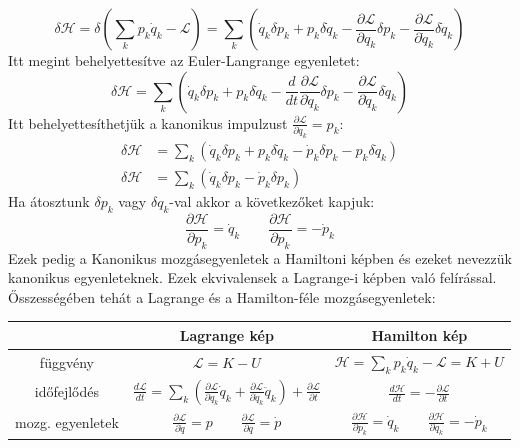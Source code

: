 \documentclass[../main.tex]{subfiles}
\begin{document}
\begin{equation}
    \delta \mathcal{H} = \delta \left( \sum_k p_k \dot{q}_k - \mathcal{L}\right) = \sum_k \left(\dot{q}_k \delta p_k + p_k \delta\dot{q}_k - \frac{\partial \mathcal{L}}{\partial q_k} \delta p_k - \frac{\partial \mathcal{L}}{\partial \dot{q}_k} \delta \dot{q}_k \right)
\end{equation}
Itt megint behelyettesítve az Euler-Langrange egyenletet:
\begin{equation}
    \delta \mathcal{H} = \sum_k \left(\dot{q}_k \delta p_k + p_k \delta\dot{q}_k - \frac{d}{dt} \frac{\partial \mathcal{L}}{\partial \dot{q}_k} \delta p_k - \frac{\partial \mathcal{L}}{\partial \dot{q}_k} \delta \dot{q}_k \right)
\end{equation}
Itt behelyettesíthetjük a kanonikus impulzust $\frac{\partial \mathcal{L}}{\partial \dot{q}_k} = p_k$:
\begin{equation}
    \begin{aligned}
        \delta \mathcal{H} &= \sum_k \left(\dot{q}_k \delta p_k + p_k \delta\dot{q}_k - \dot{p}_k \delta p_k - p_k \delta \dot{q}_k \right) \\
        \delta \mathcal{H} &= \sum_k \left(\dot{q}_k \delta p_k - \dot{p}_k \delta p_k \right)
    \end{aligned}
\end{equation}
Ha átosztunk $\delta p_k$ vagy $\delta q_k$-val akkor a következőket kapjuk:
\begin{equation}
    \frac{\partial \mathcal{H}}{\partial p_k} = \dot{q}_k \qquad \frac{\partial \mathcal{H}}{\partial p_k} = -\dot{p}_k
\end{equation}
Ezek pedig a Kanonikus mozgásegyenletek a Hamiltoni képben és ezeket nevezzük kanonikus egyenleteknek. Ezek ekvivalensek a Lagrange-i képben való felírással. Ősszességében tehát a Lagrange és a Hamilton-féle mozgásegyenletek:
\begin{center}
\begin{tabular}{ | c | c | c | }
\hline
  & Lagrange kép & Hamilton kép \\ 
    \hline
 függvény & $\mathcal{L} = K - U$ & $\mathcal{H} = \sum_k p_k\dot{q}_k - \mathcal{L} = K + U$ \\
 \hline
 időfejlődés & $\frac{d \mathcal{L}}{d t} = \sum_k \left(\frac{\partial \mathcal{L}}{\partial q_k} \dot{q}_k + \frac{\partial \mathcal{L}}{\partial \dot{q}_k} \ddot{q}_k\right) + \frac{\partial \mathcal{L}}{\partial t}$ & $\frac{d \mathcal{H}}{d t} = - \frac{\partial \mathcal{L}}{\partial t}$ \\
 \hline
 mozg. egyenletek & $\frac{\partial \mathcal{L}}{\partial \dot{q}} = p \qquad \frac{\partial \mathcal{L}}{\partial q} = \dot{p}$ & $\frac{\partial \mathcal{H}}{\partial p_k} = \dot{q}_k \qquad \frac{\partial \mathcal{H}}{\partial q_k} = - \dot{p}_k$ \\
 \hline
\end{tabular}
\end{center}
\end{document}
